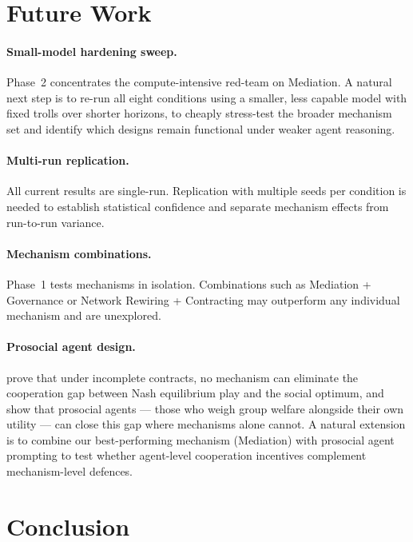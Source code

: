 \documentclass{article}
\begin{document}
\section{Future Work}
\label{sec:futurework}

\paragraph{Small-model hardening sweep.} Phase~2 concentrates the compute-intensive red-team on Mediation. A natural next step is to re-run all eight conditions using a smaller, less capable model with fixed trolls over shorter horizons, to cheaply stress-test the broader mechanism set and identify which designs remain functional under weaker agent reasoning.

\paragraph{Multi-run replication.} All current results are single-run. Replication with multiple seeds per condition is needed to establish statistical confidence and separate mechanism effects from run-to-run variance.

\paragraph{Mechanism combinations.} Phase~1 tests mechanisms in isolation. Combinations such as Mediation + Governance or Network Rewiring + Contracting may outperform any individual mechanism and are unexplored.

\paragraph{Prosocial agent design.} \citet{huang2025} prove that under incomplete contracts, no mechanism can eliminate the cooperation gap between Nash equilibrium play and the social optimum, and show that prosocial agents --- those who weigh group welfare alongside their own utility --- can close this gap where mechanisms alone cannot. A natural extension is to combine our best-performing mechanism (Mediation) with prosocial agent prompting to test whether agent-level cooperation incentives complement mechanism-level defences.

\section{Conclusion}
\label{sec:conclusion}
\end{document}
